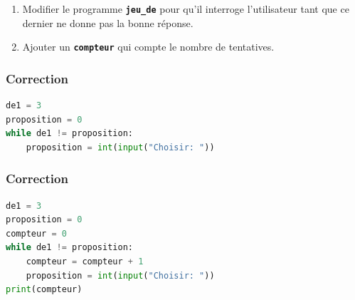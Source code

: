 \documentclass[svgnames,11pt]{beamer}
\begin{document}
\begin{frame}
    \frametitle{}

    \begin{activite}
\begin{enumerate}
    \item Modifier le programme \textbf{\texttt{jeu\_de}} pour qu'il interroge l'utilisateur tant que ce dernier ne donne pas la bonne réponse.
    \item Ajouter un \textbf{\texttt{compteur}} qui compte le nombre de tentatives.
\end{enumerate}
    \end{activite}

\end{frame}
\begin{frame}[fragile]
    \frametitle{Correction}

\begin{center}
\begin{lstlisting}[language=Python , basicstyle=\ttfamily\small, xleftmargin=2em, xrightmargin=2em]
de1 = 3
proposition = 0
while de1 != proposition:
    proposition = int(input("Choisir: "))
\end{lstlisting}
\end{center}

\end{frame}
\begin{frame}[fragile]
    \frametitle{Correction}

\begin{center}
\begin{lstlisting}[language=Python , basicstyle=\ttfamily\small, xleftmargin=2em, xrightmargin=2em]
de1 = 3
proposition = 0
compteur = 0
while de1 != proposition:
    compteur = compteur + 1
    proposition = int(input("Choisir: "))
print(compteur)
\end{lstlisting}
\end{center}

\end{frame}
\end{document}
